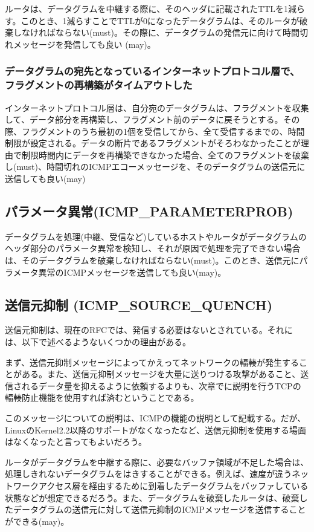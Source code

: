 ルータは、データグラムを中継する際に、そのヘッダに記載されたTTLを1減らす。このとき、1減らすことでTTLが0になったデータグラムは、そのルータが破棄しなければならない(must)。その際に、データグラムの発信元に向けて時間切れメッセージを発信しても良い (may)。

\subsubsection{データグラムの宛先となっているインターネットプロトコル層で、フラグメントの再構築がタイムアウトした}

インターネットプロトコル層は、自分宛のデータグラムは、フラグメントを収集して、データ部分を再構築し、フラグメント前のデータに戻そうとする。その際、フラグメントのうち最初の1個を受信してから、全て受信するまでの、時間制限が設定される。データの断片であるフラグメントがそろわなかったことが理由で制限時間内にデータを再構築できなかった場合、全てのフラグメントを破棄し(must)、時間切れのICMPエコーメッセージを、そのデータグラムの送信元に送信しても良い(may)

\subsection{パラメータ異常(ICMP\_PARAMETERPROB)}

データグラムを処理(中継、受信など)しているホストやルータがデータグラムのヘッダ部分のパラメータ異常を検知し、それが原因で処理を完了できない場合は、そのデータグラムを破棄しなければならない(must)。このとき、送信元にパラメータ異常のICMPメッセージを送信しても良い(may)。

\subsection{送信元抑制 (ICMP\_SOURCE\_QUENCH)}

送信元抑制は、現在のRFCでは、発信する必要はないとされている。それには、以下で述べるようないくつかの理由がある。

まず、送信元抑制メッセージによってかえってネットワークの輻輳が発生することがある。また、送信元抑制メッセージを大量に送りつける攻撃があること、送信されるデータ量を抑えるように依頼するよりも、次章でに説明を行うTCPの輻輳防止機能を使用すれば済むということである。

このメッセージについての説明は、ICMPの機能の説明として記載する。だが、 LinuxのKernel2.2以降のサポートがなくなったなど、送信元抑制を使用する場面はなくなったと言ってもよいだろう。

ルータがデータグラムを中継する際に、必要なバッファ領域が不足した場合は、処理しきれないデータグラムをはきすることができる。例えば、速度が違うネットワークアクセス層を経由するために到着したデータグラムをバッファしている状態などが想定できるだろう。また、データグラムを破棄したルータは、破棄したデータグラムの送信元に対して送信元抑制のICMPメッセージを送信することができる(may)。


